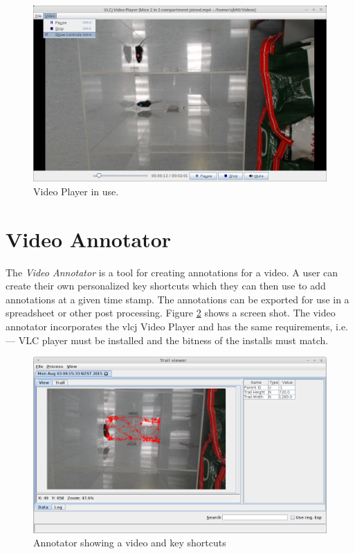 \documentclass[a4paper]{book}
\begin{document}
 \begin{figure}[htb]
   \centering
   \includegraphics[width=12.0cm]{images/video_player_in_use.png}
   \caption{Video Player in use.}
   \label{VideoPlayerInUse}
 \end{figure}

\section{Video Annotator}
The \textit{Video Annotator} is a tool for creating annotations for a video. A user can
create their own personalized key shortcuts which they can then use to add annotations at a given time stamp.
The annotations can be exported for use in a spreadsheet or other post processing. Figure \ref{annotator_in_use}
shows a screen shot. The video annotator incorporates the vlcj Video Player and has the same requirements, i.e. --- VLC
player must be installed and the bitness of the installs must match.

\begin{figure}[htb]
  \centering
  \includegraphics[width= 12.0cm]{images/trail_viewer.png}
  \caption{Annotator showing a video and key shortcuts}
  \label{annotator_in_use}
\end{figure}
\end{document}
